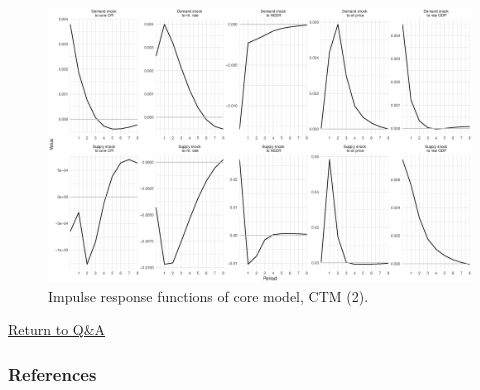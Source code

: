 \documentclass{beamer}
\begin{document}
\begin{frame}[noframenumbering]
	\begin{figure}[h!]
		\centering
		\includegraphics[width=1\linewidth]{../Text/figures/irf_core_2}
		\caption[]{Impulse response functions of core model, CTM (2).}
		\label{fig:irf_core_2}
	\end{figure}
\hyperref[qa]{Return to Q\&A}
\end{frame}

\begin{frame}
	\frametitle{References}
	\label{references}
	\tiny{
		\printbibliography[heading=none]}
\end{frame}
\end{document}
